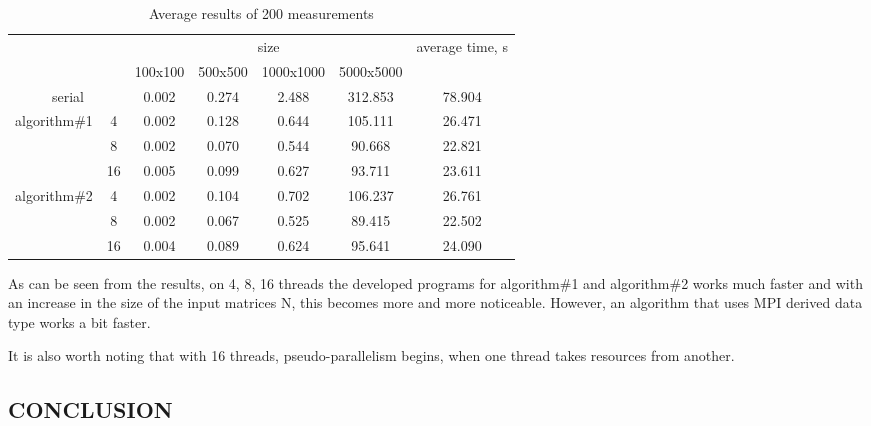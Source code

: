 \begin{table}[H]
\caption{Average results of 200 measurements}
\begin{tabular}{cc|c|c|c|c|c|}
\cline{3-7}
                                                   &    & \multicolumn{4}{c|}{size}                 & \multirow{2}{*}{average time, s} \\ \cline{3-6}
                                                   &    & 100x100 & 500x500 & 1000x1000 & 5000x5000 &                                  \\ \hline
\multicolumn{2}{|c|}{serial}                            & 0.002   & 0.274   & 2.488     & 312.853   & 78.904                           \\ \hline
\multicolumn{1}{|c|}{\multirow{3}{*}{algorithm\#1}} & 4  & 0.002   & 0.128   & 0.644     & 105.111   & 26.471                           \\ \cline{2-7}
\multicolumn{1}{|c|}{}                             & 8  & 0.002   & 0.070   & 0.544     & 90.668    & 22.821                           \\ \cline{2-7}
\multicolumn{1}{|c|}{}                             & 16 & 0.005   & 0.099   & 0.627     & 93.711    & 23.611                           \\ \hline
\multicolumn{1}{|c|}{\multirow{3}{*}{algorithm\#2}} & 4  & 0.002   & 0.104   & 0.702     & 106.237   & 26.761                           \\ \cline{2-7}
\multicolumn{1}{|c|}{}                             & 8  & 0.002   & 0.067   & 0.525     & 89.415    & 22.502                           \\ \cline{2-7}
\multicolumn{1}{|c|}{}                             & 16 & 0.004   & 0.089   & 0.624     & 95.641    & 24.090                           \\ \hline
\end{tabular}
\label{tbl:measure}
\end{table}

As can be seen from the results, on 4, 8, 16 threads the developed programs for algorithm\#1 and algorithm\#2 works much faster and with an increase in the size of the input matrices N, this becomes more and more noticeable.
However, an algorithm that uses MPI derived data type works a bit faster.

It is also worth noting that with 16 threads, pseudo-parallelism begins, when one thread takes resources from another.

\subsection{CONCLUSION}\label{subsec:conclusion}

